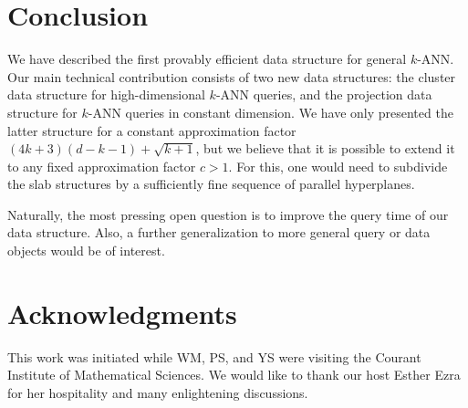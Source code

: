 \documentclass[a4paper,11pt]{paper}
\newcommand{\lowdimapprox}[1][]{(4k+3)(d#1-k-1)+\sqrt{k+1}}
\begin{document}
\section{Conclusion}
We have described the first provably efficient
data structure for general $k$-ANN.
Our main technical contribution consists of two
new data structures: the cluster data structure
for high-dimensional $k$-ANN queries, and the
projection data structure for $k$-ANN queries
in constant dimension. We have only
presented the latter structure for a constant approximation factor
$\lowdimapprox$, but we believe that it is possible to extend
it to any fixed approximation factor $c > 1$.
For this, one would need to subdivide the slab structures by
a sufficiently fine sequence of parallel hyperplanes.

Naturally, the most pressing open question is to improve the
query time of our data structure. Also, a further generalization
to more general query or data objects would be of interest.

\section*{Acknowledgments}
This work was initiated while WM, PS, and YS
were visiting the Courant Institute of Mathematical Sciences.
We would like to thank our host Esther Ezra for her hospitality
and many enlightening discussions.



\end{document}
